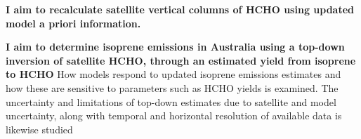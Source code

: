   \textbf{I aim to recalculate satellite vertical columns of HCHO using updated model a priori information.}
  
   
  \textbf{I aim to determine isoprene emissions in Australia using a top-down inversion of satellite HCHO, through an estimated yield from isoprene to HCHO}
  How models respond to updated isoprene emissions estimates and how these are sensitive to parameters such as HCHO yields is examined.
  The uncertainty and limitations of top-down estimates due to satellite and model uncertainty, along with temporal and horizontal resolution of available data is likewise studied
   
